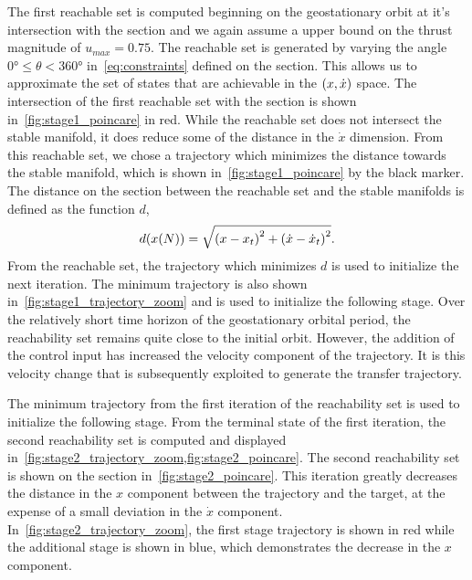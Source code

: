 The first reachable set is computed beginning on the geostationary orbit at it's intersection with the \Poincare section and we again assume a upper bound on the thrust magnitude of \( u_{max} = 0.75 \).
The reachable set is generated by varying the angle \( \ang{0} \leq \theta < \ang{360} \) in~\cref{eq:constraints} defined on the \Poincare section.
This allows us to approximate the set of states that are achievable in the \( \left( x ,\dot{x} \right) \) space.
The intersection of the first reachable set with the \Poincare section is shown in~\cref{fig:stage1_poincare} in red.
While the reachable set does not intersect the stable manifold, it does reduce some of the distance in the \(\dot{x}\) dimension.
From this reachable set, we chose a trajectory which minimizes the distance towards the stable manifold, which is shown in~\cref{fig:stage1_poincare} by the black marker.
The distance on the \Poincare section between the reachable set and the stable manifolds is defined as the function \( d \),
\begin{align*}
        d(x(N)) = \sqrt{\left( x - x_t \right)^2 + \left( \dot{x} - \dot{x}_t \right)^2}.
\end{align*}
From the reachable set, the trajectory which minimizes \( d \) is used to initialize the next iteration.
The minimum trajectory is also shown in~\cref{fig:stage1_trajectory_zoom} and is used to initialize the following stage.
Over the relatively short time horizon of the geostationary orbital period, the reachability set remains quite close to the initial orbit. 
However, the addition of the control input has increased the velocity component of the trajectory.
It is this velocity change that is subsequently exploited to generate the transfer trajectory.

The minimum trajectory from the first iteration of the reachability set is used to initialize the following stage.
From the terminal state of the first iteration, the second reachability set is computed and displayed in~\cref{fig:stage2_trajectory_zoom,fig:stage2_poincare}.
The second reachability set is shown on the \Poincare section in~\cref{fig:stage2_poincare}.
This iteration greatly decreases the distance in the \( x \) component between the trajectory and the target, at the expense of a small deviation in the \( \dot{x} \) component.
In~\cref{fig:stage2_trajectory_zoom}, the first stage trajectory is shown in red while the additional stage is shown in blue, which demonstrates the decrease in the \( x \) component.

